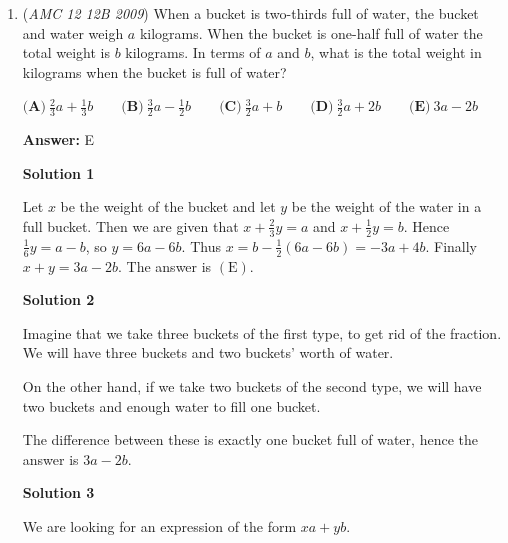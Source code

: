 \begin{enumerate}
 When it rose by $20\%$, it became $\$120$, when it fell by $20\%$, it became $\$96$, and when it rose by $25\%$, it became $\$120$ again. 

 In order for the price at the end of April to be the same as it was at the beginning of January ($\$100$), the price must decrease by $\$20$. 

 20 is $\frac{1}{6}th$ of 120, and $\frac{1}{6} \approx 0.167 \approx 17\%$ So to the nearest integer, $x = 17$ and the answer is $\boxed{\textbf{(B) } 17}$. ~azc1027

 


	\item (\textit{AMC 12 12B 2009}) When a bucket is two-thirds full of water, the bucket and water weigh $a$ kilograms. When the bucket is one-half full of water the total weight is $b$ kilograms. In terms of $a$ and $b$, what is the total weight in kilograms when the bucket is full of water?


 $\textbf{(A)}\ \frac23a + \frac13b\qquad \textbf{(B)}\ \frac32a - \frac12b\qquad \textbf{(C)}\ \frac32a + b \qquad \textbf{(D)}\ \frac32a + 2b\qquad \textbf{(E)}\ 3a - 2b$

 \textbf{Answer: }E



\textbf{Solution 1}

Let $x$ be the weight of the bucket and let $y$ be the weight of the water in a full bucket.  Then we are given that $x + \frac 23y = a$ and $x + \frac 12y = b$.  Hence $\frac 16y = a-b$, so $y = 6a-6b$.  Thus $x = b - \frac 12 (6a-6b) = -3a + 4b$.  Finally $x + y = \boxed {3a-2b}$. The answer is $\mathrm{(E)}$.

 



\textbf{Solution 2}

Imagine that we take three buckets of the first type, to get rid of the fraction. We will have three buckets and two buckets' worth of water.

 On the other hand, if we take two buckets of the second type, we will have two buckets and enough water to fill one bucket.

 The difference between these is exactly one bucket full of water, hence the answer is $3a-2b$.

 



\textbf{Solution 3}

We are looking for an expression of the form $xa + yb$.


\end{enumerate}
